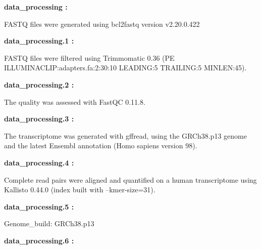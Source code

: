 \documentclass[
]{article}
\begin{document}
\begin{center}\begin{tcolorbox}[colback=gray!10, colframe=gray!50, width=0.9\linewidth, arc=1mm, boxrule=0.5pt]
\textbf{
data\_processing
:}

\vspace{0.5em}

    FASTQ files were generated using bcl2fastq version
v2.20.0.422

\vspace{2em}


\textbf{
data\_processing.1
:}

\vspace{0.5em}

    FASTQ files were filtered using Trimmomatic 0.36 (PE
ILLUMINACLIP:adapters.fa:2:30:10 LEADING:5 TRAILING:5
MINLEN:45).

\vspace{2em}


\textbf{
data\_processing.2
:}

\vspace{0.5em}

    The quality was assessed with FastQC 0.11.8.

\vspace{2em}


\textbf{
data\_processing.3
:}

\vspace{0.5em}

    The transcriptome was generated with gffread, using the
GRCh38.p13 genome and the latest Ensembl annotation (Homo
sapiens version 98).

\vspace{2em}


\textbf{
data\_processing.4
:}

\vspace{0.5em}

    Complete read pairs were aligned and quantified on a
human transcriptome using Kallisto 0.44.0 (index built with
–kmer-size=31).

\vspace{2em}


\textbf{
data\_processing.5
:}

\vspace{0.5em}

    Genome\_build: GRCh38.p13

\vspace{2em}


\textbf{
data\_processing.6
:}


\end{tcolorbox}
\end{center}
\end{document}
